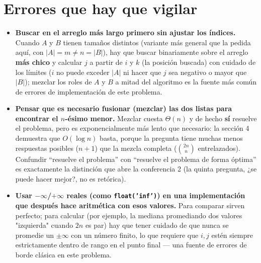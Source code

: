 \documentclass[11pt]{article}
\begin{document}
\section*{Errores que hay que vigilar}

\begin{alerta}{}
\begin{itemize}[leftmargin=14pt]
\item \textbf{Buscar en el arreglo más largo primero sin ajustar los índices.} Cuando $A$ y $B$ tienen
tamaños distintos (variante más general que la pedida aquí, con $|A|=m\ne n=|B|$), hay que buscar binariamente
sobre el arreglo \textbf{más chico} y calcular $j$ a partir de $i$ y $k$ (la posición buscada) con cuidado
de los límites ($i$ no puede exceder $|A|$ ni hacer que $j$ sea negativo o mayor que $|B|$); mezclar los
roles de $A$ y $B$ a mitad del algoritmo es la fuente más común de errores de implementación de este
problema.
\item \textbf{Pensar que es necesario fusionar (mezclar) las dos listas para encontrar el $n$-ésimo
menor.} Mezclar cuesta $\Theta(n)$ y de hecho \textbf{sí} resuelve el problema, pero es exponencialmente
más lento que necesario: la sección 4 demuestra que $O(\log n)$ basta, porque la pregunta tiene muchas menos
respuestas posibles ($n{+}1$) que la mezcla completa ($\binom{2n}{n}$ entrelazados). Confundir ``resuelve el
problema'' con ``resuelve el problema de forma óptima'' es exactamente la distinción que abre la
conferencia 2 (la quinta pregunta, ¿se puede hacer mejor?, no es retórica).
\item \textbf{Usar $-\infty$/$+\infty$ reales (como \texttt{float('inf')}) en una implementación que
después hace aritmética con esos valores.} Para comparar sirven perfecto; para calcular (por ejemplo, la
mediana promediando dos valores "izquierda" cuando $2n$ es par) hay que tener cuidado de que nunca se
promedie un $\pm\infty$ con un número finito, lo que requiere que $i,j$ estén siempre estrictamente dentro
de rango en el punto final --- una fuente de errores de borde clásica en este problema.
\end{itemize}
\end{alerta}
\end{document}
